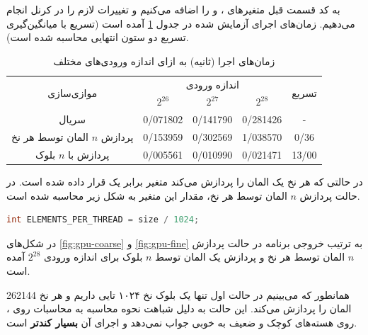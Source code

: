 \documentclass{HW}
\begin{document}
به کد قسمت قبل متغیرهای
،
و
را اضافه می‌کنیم و تغییرات لازم را در کرنل انجام می‌دهیم. زمان‌های اجرای آزمایش شده در جدول
\ref{tab:gpuAdd}
آمده است (تسریع با میانگین‌گیری تسریع دو ستون انتهایی محاسبه شده است).

\begin{table}[ht]
\caption{زمان‌های اجرا (ثانیه) به ازای اندازه ورودی‌های مختلف}
\begin{center}
\begin{tabular}{|c|c|c|c|c|}
    \hline
    \multirow{2}{*}{موازی‌سازی} & \multicolumn{3}{|c|}{اندازه ورودی}& \multirow{2}{*}{تسریع} \\
    \cline{2-4}
& $2^{26}$ & $2^{27}$ & $2^{28}$ & \\
    \hline
  سریال & 
  0/071802 & 0/141790 & 0/281426 & - \\ \hline
  
  پردازش $n$ المان توسط هر نخ &
  0/153959 & 0/302569 & 1/038570 & 0/36 \\ \hline
  
  پردازش با $n$ بلوک & 
  0/005561 & 0/010990 & 0/021471 & 13/00 \\ \hline
\end{tabular}
\end{center}
\label{tab:gpuAdd}
\end{table}

در حالتی که هر نخ یک المان را پردازش می‌کند متغیر  برابر یک قرار داده شده است. در حالت پردازش $n$ المان توسط هر نخ، مقدار این متغیر به شکل زیر محاسبه شده است.

\begin{latin}
\begin{lstlisting}[language=C]
int ELEMENTS_PER_THREAD = size / 1024;
\end{lstlisting}
\end{latin}

در شکل‌های
\ref{fig:gpu-coarse}
و
\ref{fig:gpu-fine}
به ترتیب خروجی برنامه در حالت پردازش $n$ المان توسط هر نخ و پردازش یک المان توسط $n$ بلوک برای اندازه ورودی $2^{28}$ آمده است.

 همانطور که می‌بینیم در حالت اول تنها یک بلوک نخ ۱۰۲۴ تایی داریم و هر نخ 262144 المان را پردازش می‌کند. این حالت به دلیل شباهت نحوه محاسبه به محاسبات روی ، روی هسته‌های کوچک و ضعیف  به خوبی جواب نمی‌دهد و اجرای آن \textbf{بسیار کندتر} است.
 
\end{document}
